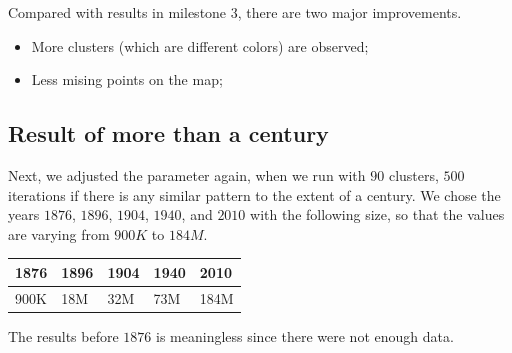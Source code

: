 Compared with results in milestone $3$, there are two major improvements.
\begin{itemize}
    \item More clusters (which are different colors) are observed;
    \item Less mising points on the map;
\end{itemize}

\subsection{Result of more than a century}
Next, we adjusted the parameter again, when we run with $90$ clusters, $500$ iterations if there is any similar pattern to the extent of a century. We chose the years $1876$, $1896$, $1904$, $1940$, and $2010$ with the following size, so that the values are varying from $900K$ to $184M$.

\begin{table}
    \centering
    \begin{tabular}{|l|l|l|l|l|}
        \hline
        1876 & 1896 & 1904 & 1940 & 2010 \\
        \hline
        900K & 18M & 32M & 73M & 184M \\
        \hline
    \end{tabular}
\end{table}

The results before $1876$ is meaningless since there were not enough data.

